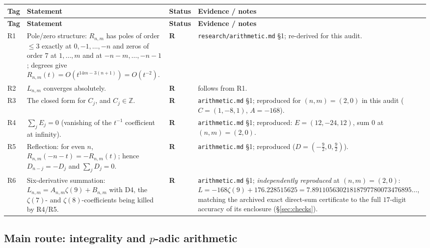 \documentclass[11pt]{article}
\newcommand{\stR}{\textcolor{okgreen}{\textbf{R}}}
\newcommand{\Z}{\mathbb{Z}}
\begin{document}
\begin{longtable}{@{}p{}p{}p{}p{}@{}}
\toprule \textbf{Tag} & \textbf{Statement} & \textbf{Status} & \textbf{Evidence / notes} \\ \midrule
\endfirsthead
\toprule \textbf{Tag} & \textbf{Statement} & \textbf{Status} & \textbf{Evidence / notes} \\ \midrule
\endhead
R1 & Pole/zero structure: $R_{n,m}$ has poles of order $\le3$ exactly at $0,-1,\dots,-n$ and zeros of
     order $7$ at $1,\dots,m$ and at $-n-m,\dots,-n-1$; degrees give
     $R_{n,m}(t)=O(t^{14m-3(n+1)})=O(t^{-2})$. & \stR & \texttt{research/arithmetic.md} \S1;
     re-derived for this audit. \\
R2 & $L_{n,m}$ converges absolutely. & \stR & follows from R1. \\
R3 & The closed form for $C_j$, and $C_j\in\Z$. & \stR & \texttt{arithmetic.md} \S1; reproduced
     for $(n,m)=(2,0)$ in this audit ($C=(1,-8,1)$, $A=-168$). \\
R4 & $\sum_jE_j=0$ (vanishing of the $t^{-1}$ coefficient at infinity). & \stR & \texttt{arithmetic.md} \S1;
     reproduced: $E=(12,-24,12)$, sum $0$ at $(n,m)=(2,0)$. \\
R5 & Reflection: for even $n$, $R_{n,m}(-n-t)=-R_{n,m}(t)$; hence $D_{n-j}=-D_j$ and $\sum_jD_j=0$. & \stR
     & \texttt{arithmetic.md} \S1; reproduced ($D=(-\tfrac92,0,\tfrac92)$). \\
R6 & Six-derivative summation: $L_{n,m}=A_{n,m}\zeta(9)+B_{n,m}$ with D4, the $\zeta(7)$- and
     $\zeta(8)$-coefficients being killed by R4/R5. & \stR & \texttt{arithmetic.md} \S1;
     \emph{independently reproduced} at $(n,m)=(2,0)$: $L=-168\zeta(9)+176.228515625
     =7.89110563021818797780073476895\ldots$, matching the archived exact direct-sum certificate to the
     full $17$-digit accuracy of its enclosure (\S\ref{sec:checks}). \\
\bottomrule
\end{longtable}

\subsection{Main route: integrality and $p$-adic arithmetic}
\end{document}
